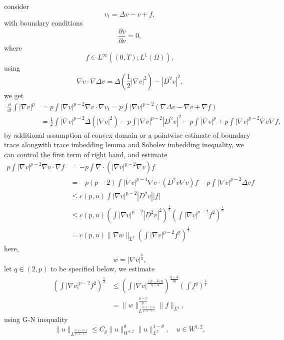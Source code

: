 consider \cite{Winkler2023}
\begin{equation}
	v_t = \Delta v - v + f,
\end{equation}
with boundary conditions
\begin{equation*}
	\frac{\partial v}{\partial\nu} = 0,
\end{equation*}
where 
\begin{equation*}
	f\in L^\infty((0,T); L^1(\Omega)),
\end{equation*}
using \[
\nabla v \cdot \nabla \Delta v=\Delta\left(\frac{1}{2}|\nabla v|^2\right)-\left|D^2 v\right|^2,
\]
we get
\begin{align*}
	\frac{\dd}{\dd t}\int|\nabla v|^p 
	&= p\int |\nabla v|^{p-2}\nabla v\cdot \nabla v_t 
	= p\int |\nabla v|^{p-2} (\nabla \Delta v - \nabla v + \nabla f) \\
	&= \frac12\int |\nabla v|^{p-2}\Delta (|\nabla v|^2) - p\int |\nabla v|^{p-2}|D^2v|^2 
		-p\int |\nabla v|^p + p\int |\nabla v|^{p-2}\nabla v \nabla f,
\end{align*}
by additional assumption of convex domain 
or a pointwise estimate of boundary trace alongwith trace imbedding lemma and Sobolev imbedding inequality,
we can control the first term of right hand, and estimate
\begin{align*}
	p\int |\nabla v|^{p-2}\nabla v \cdot \nabla f 
	&= - p\int \nabla\cdot(|\nabla v|^{p-2}\nabla v) f\\
	&= -p(p-2)\int |\nabla v|^{p-4}\nabla v\cdot (D^2v\nabla v) f 
		- p \int |\nabla v|^{p-2}\Delta v f\\
	&\leq c(p,n)\int |\nabla v|^{p-2} |D^2v| |f|\\
	&\leq c(p,n)\left(\int |\nabla v|^{p-2}|D^2v|^2\right)^{\frac12}
	\left(\int |\nabla v|^{p-2}f^2\right)^{\frac12}\\
	&= c(p,n) \|\nabla w\|_{L^2} \left(\int |\nabla v|^{p-2}f^2\right)^{\frac12}
\end{align*}
here, 
\[
	w = |\nabla v|^{\frac{p}{2}},	
\]
let $q\in(2,p)$ to be specified below, we estimate
\begin{align*}
	\left(\int |\nabla v|^{p-2}f^2\right)^{\frac12}
	&\leq \left(\int |\nabla v|^{\frac{(p-2)q}{q-2}}\right)^{\frac{q-2}{2q}}
	\left(\int f^q\right)^{\frac{1}{q}}\\
	&= \|w\|_{L^{\frac{2(p-2)q}{p(q-2)}}}^{\frac{p-2}{p}}
		\|f\|_{L^q},
\end{align*}
using G-N inequality
\[
	\|u\|_{L^{\frac{2(p-2)q}{p(q-2)}}}
	\leq C_g \|u\|_{W^{1,2}}^\theta\|u\|_{L^2}^{1-\theta},\quad u\in W^{1,2}, 
\]
